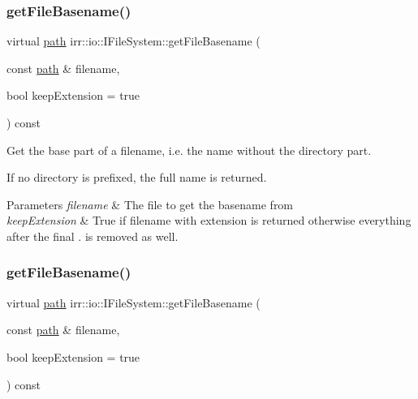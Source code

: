 \subsubsection{\texorpdfstring{get\+File\+Basename()}{getFileBasename()}\hspace{0.1cm}{\footnotesize\ttfamily [1/2]}}
{\footnotesize\ttfamily virtual \hyperlink{namespaceirr_1_1io_a6468281622ce3a1c46b72e19f32dded5}{path} irr\+::io\+::\+I\+File\+System\+::get\+File\+Basename (\begin{DoxyParamCaption}\item[{const \hyperlink{namespaceirr_1_1io_a6468281622ce3a1c46b72e19f32dded5}{path} \&}]{filename,  }\item[{bool}]{keep\+Extension = {\ttfamily true} }\end{DoxyParamCaption}) const\hspace{0.3cm}{\ttfamily [pure virtual]}}



Get the base part of a filename, i.\+e. the name without the directory part. 

If no directory is prefixed, the full name is returned. 
\begin{DoxyParams}{Parameters}
{\em filename} & The file to get the basename from \\
\hline
{\em keep\+Extension} & True if filename with extension is returned otherwise everything after the final \textquotesingle{}.\textquotesingle{} is removed as well. \\
\hline
\end{DoxyParams}
\mbox{\label{classirr_1_1io_1_1IFileSystem_a4235989e4ec21c78f1fd1ca861980c6c}} 
\subsubsection{\texorpdfstring{get\+File\+Basename()}{getFileBasename()}\hspace{0.1cm}{\footnotesize\ttfamily [2/2]}}
{\footnotesize\ttfamily virtual \hyperlink{namespaceirr_1_1io_a6468281622ce3a1c46b72e19f32dded5}{path} irr\+::io\+::\+I\+File\+System\+::get\+File\+Basename (\begin{DoxyParamCaption}\item[{const \hyperlink{namespaceirr_1_1io_a6468281622ce3a1c46b72e19f32dded5}{path} \&}]{filename,  }\item[{bool}]{keep\+Extension = {\ttfamily true} }\end{DoxyParamCaption}) const\hspace{0.3cm}{\ttfamily [pure virtual]}}



